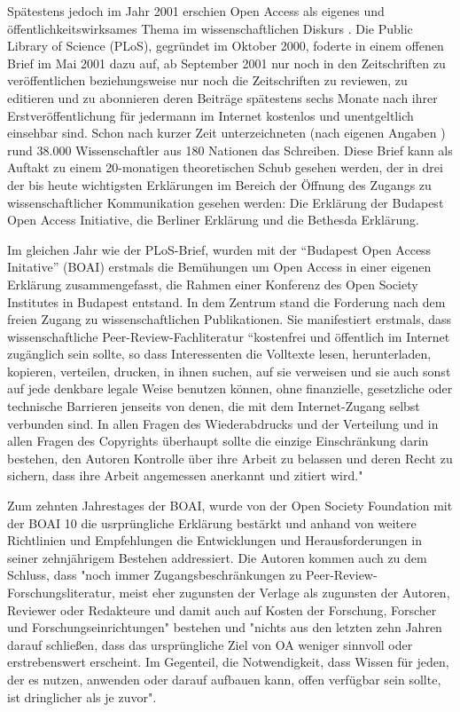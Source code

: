 Spätestens jedoch im Jahr 2001 erschien Open Access als eigenes und öffentlichkeitswirksames Thema im wissenschaftlichen Diskurs \cite{cite:19}. Die Public Library of Science (PLoS), gegründet im Oktober 2000, foderte in einem offenen Brief im Mai 2001 \cite{cite:20} dazu auf, ab September 2001 nur noch in den Zeitschriften zu veröffentlichen beziehungsweise nur noch die Zeitschriften zu reviewen, zu editieren und zu abonnieren deren Beiträge spätestens sechs Monate nach ihrer Erstveröffentlichung für jedermann im Internet kostenlos und unentgeltlich einsehbar sind. Schon nach kurzer Zeit unterzeichneten (nach eigenen Angaben \cite{cite:19a}) rund 38.000 Wissenschaftler aus 180 Nationen das Schreiben. Diese Brief kann als Auftakt zu einem 20-monatigen theoretischen Schub gesehen werden, der in drei der bis heute wichtigsten Erklärungen im Bereich der Öffnung des Zugangs zu wissenschaftlicher Kommunikation gesehen werden: Die Erklärung der Budapest Open Access Initiative, die Berliner Erklärung und die Bethesda Erklärung. \cite{CREATe_2014}

Im gleichen Jahr wie der PLoS-Brief, wurden mit der “Budapest Open Access Initative” (BOAI)\cite{boai_2012} erstmals die Bemühungen um Open Access in einer eigenen Erklärung zusammengefasst\cite{cite:21a}, die Rahmen einer Konferenz des Open Society Institutes in Budapest entstand. In dem Zentrum stand die Forderung nach dem freien Zugang zu wissenschaftlichen Publikationen. Sie manifestiert erstmals, dass wissenschaftliche Peer-Review-Fachliteratur “kostenfrei und öffentlich im Internet zugänglich sein sollte, so dass Interessenten die Volltexte lesen, herunterladen, kopieren, verteilen, drucken, in ihnen suchen, auf sie verweisen und sie auch sonst auf jede denkbare legale Weise benutzen können, ohne finanzielle, gesetzliche oder technische Barrieren jenseits von denen, die mit dem Internet-Zugang selbst verbunden sind. In allen Fragen des Wiederabdrucks und der Verteilung und in allen Fragen des Copyrights überhaupt sollte die einzige Einschränkung darin bestehen, den Autoren Kontrolle über ihre Arbeit zu belassen und deren Recht zu sichern, dass ihre Arbeit angemessen anerkannt und zitiert wird."\cite{boai_2012} 

Zum zehnten Jahrestages der BOAI, wurde von der Open Society Foundation mit der BOAI 10 die usrprüngliche Erklärung bestärkt und anhand von weitere Richtlinien und Empfehlungen die Entwicklungen und Herausforderungen in seiner zehnjährigem Bestehen addressiert. Die Autoren kommen auch zu dem Schluss, dass  "noch immer Zugangsbeschränkungen zu Peer-Review-Forschungsliteratur, meist eher zugunsten der Verlage als zugunsten der Autoren, Reviewer oder Redakteure und damit auch auf Kosten der Forschung, Forscher und Forschungseinrichtungen" bestehen und "nichts aus den letzten zehn Jahren darauf schließen, dass das ursprüngliche Ziel von OA weniger sinnvoll oder erstrebenswert erscheint. Im Gegenteil, die Notwendigkeit, dass Wissen für jeden, der es nutzen, anwenden oder darauf aufbauen kann, offen verfügbar sein sollte, ist dringlicher als je zuvor".\cite{boai_2012}

